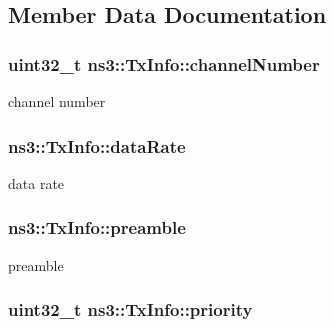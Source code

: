 \subsection{Member Data Documentation}
\subsubsection[{\texorpdfstring{channel\+Number}{channelNumber}}]{\setlength{\rightskip}{0pt plus 5cm}uint32\+\_\+t ns3\+::\+Tx\+Info\+::channel\+Number}\hypertarget{structns3_1_1TxInfo_af6ef3deecf1b95301b613ae51a47f9f7}{}\label{structns3_1_1TxInfo_af6ef3deecf1b95301b613ae51a47f9f7}


channel number 

\subsubsection[{\texorpdfstring{data\+Rate}{dataRate}}]{ ns3\+::\+Tx\+Info\+::data\+Rate}\hypertarget{structns3_1_1TxInfo_adf93807eb0baa3790e629a98e112520b}{}\label{structns3_1_1TxInfo_adf93807eb0baa3790e629a98e112520b}


data rate 

\subsubsection[{\texorpdfstring{preamble}{preamble}}]{ ns3\+::\+Tx\+Info\+::preamble}\hypertarget{structns3_1_1TxInfo_aea89775bfda7720ef893f10a4072dd76}{}\label{structns3_1_1TxInfo_aea89775bfda7720ef893f10a4072dd76}


preamble 

\subsubsection[{\texorpdfstring{priority}{priority}}]{\setlength{\rightskip}{0pt plus 5cm}uint32\+\_\+t ns3\+::\+Tx\+Info\+::priority}\hypertarget{structns3_1_1TxInfo_a9f3ef3b03233636da92e9ca863fc29a7}{}\label{structns3_1_1TxInfo_a9f3ef3b03233636da92e9ca863fc29a7}


